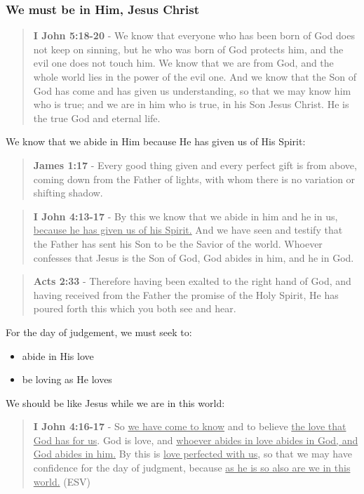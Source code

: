 \documentclass[11pt]{article}
\begin{document}
\subsubsection{We must be in Him, Jesus Christ}
\label{sec:orga491aef}
\begin{quote}
\textbf{I John 5:18-20} - We know that everyone who has been born of God does not keep on sinning, but he who was born of God protects him, and the evil one does not touch him. We know that we are from God, and the whole world lies in the power of the evil one. And we know that the Son of God has come and has given us understanding, so that we may know him who is true; and we are in him who is true, in his Son Jesus Christ. He is the true God and eternal life.
\end{quote}

We know that we abide in Him because He has given us of His Spirit:

\begin{quote}
\textbf{James 1:17} - Every good thing given and every perfect gift is from above, coming down from the Father of lights, with whom there is no variation or shifting shadow.
\end{quote}

\begin{quote}
\textbf{I John 4:13-17} - By this we know that we abide in him and he in us, \uline{because he has given us of his Spirit.} And we have seen and testify that the Father has sent his Son to be the Savior of the world. Whoever confesses that Jesus is the Son of God, God abides in him, and he in God.
\end{quote}

\begin{quote}
\textbf{Acts 2:33} - Therefore having been exalted to the right hand of God, and having received from the Father the promise of the Holy Spirit, He has poured forth this which you both see and hear.
\end{quote}

For the day of judgement, we must seek to:
\begin{itemize}
\item abide in His love
\item be loving as He loves
\end{itemize}

We should be like Jesus while we are in this world:

\begin{quote}
\textbf{I John 4:16-17} - So \uline{we have come to know} and to believe \uline{the love that God has for us}. God is love, and \uline{whoever abides in love abides in God, and God abides in him.} By this is \uline{love perfected with us}, so that we may have confidence for the day of judgment, because \uline{as he is so also are we in this world.} (ESV)
\end{quote}
\end{document}
